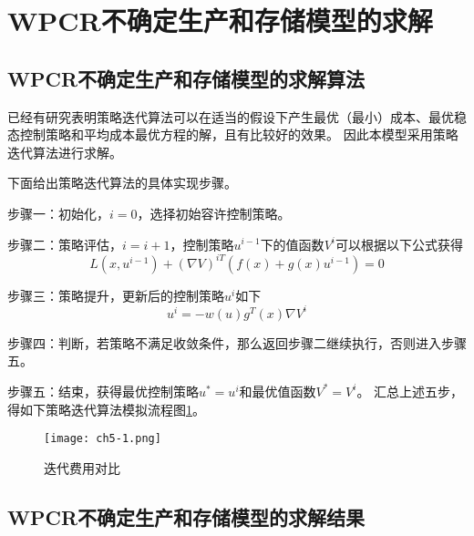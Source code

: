 \section{WPCR不确定生产和存储模型的求解}

\subsection{WPCR不确定生产和存储模型的求解算法}

已经有研究表明策略迭代算法可以在适当的假设下产生最优（最小）成本、最优稳态控制策略和平均成本最优方程的解，且有比较好的效果。
因此本模型采用策略迭代算法进行求解。

下面给出策略迭代算法的具体实现步骤。

步骤一：初始化，$i=0$，选择初始容许控制策略。

步骤二：策略评估，$i=i+1$，控制策略$u^{i-1}$下的值函数$V^i$可以根据以下公式获得
\begin{equation}
    L(x,u^{i-1}) + (\nabla V)^{iT}(f(x)+g(x)u^{i-1})=0
\end{equation}

步骤三：策略提升，更新后的控制策略$u^i$如下
\begin{equation}
    u^i=-w(u)g^T(x)\nabla V^i
\end{equation}

步骤四：判断，若策略不满足收敛条件，那么返回步骤二继续执行，否则进入步骤五。

步骤五：结束，获得最优控制策略$u^*=u^i$和最优值函数$V^*=V^i$。
汇总上述五步，得如下策略迭代算法模拟流程图\ref{f.ch5-1}\cite{叶帅2021基于事件触发自适应动态规划的多四旋翼无人机优化控制}。

\begin{figure}[h]
    \centering
    \texttt{[image: ch5-1.png]}
    \caption{迭代费用对比}
    \label{f.ch5-1}
\end{figure}

\subsection{WPCR不确定生产和存储模型的求解结果}


